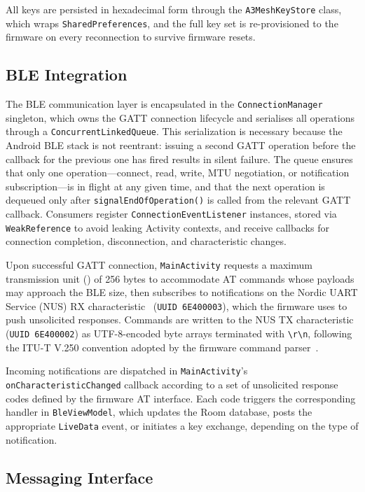 \documentclass[english,bachelor]{tfgitic}[2026/01/22]
\begin{document}
All keys are persisted in hexadecimal form through the \texttt{A3MeshKeyStore} class, which wraps \texttt{SharedPreferences}, and the full key set is re-provisioned to the firmware on every reconnection to survive firmware resets.

\subsection{BLE Integration}

The BLE communication layer is encapsulated in the \texttt{ConnectionManager} singleton, which owns the GATT connection lifecycle and serialises all operations through a \texttt{ConcurrentLinkedQueue}. This serialization is necessary because the Android BLE stack is not reentrant: issuing a second GATT operation before the callback for the previous one has fired results in silent failure. The queue ensures that only one operation---connect, read, write, MTU negotiation, or notification subscription---is in flight at any given time, and that the next operation is dequeued only after \texttt{signalEndOfOperation()} is called from the relevant GATT callback. Consumers register \texttt{ConnectionEventListener} instances, stored via \texttt{WeakReference} to avoid leaking Activity contexts, and receive callbacks for connection completion, disconnection, and characteristic changes.

Upon successful GATT connection, \texttt{MainActivity} requests a maximum transmission unit () of 256 bytes to accommodate AT commands whose payloads may approach the BLE  size, then subscribes to notifications on the Nordic UART Service (NUS) RX characteristic~\cite{nordic2023nus} (\texttt{UUID 6E400003}), which the firmware uses to push unsolicited responses. Commands are written to the NUS TX characteristic (\texttt{UUID 6E400002}) as UTF-8-encoded byte arrays terminated with \texttt{\textbackslash r\textbackslash n}, following the ITU-T V.250 convention adopted by the firmware command parser~\cite{itu1999v250}.

Incoming notifications are dispatched in \texttt{MainActivity}'s \texttt{onCharacteristic\-Changed} callback according to a set of unsolicited response codes defined by the firmware AT interface. Each code triggers the corresponding handler in \texttt{BleViewModel}, which updates the Room database, posts the appropriate \texttt{LiveData} event, or initiates a key exchange, depending on the type of notification.

\subsection{Messaging Interface}
\end{document}
